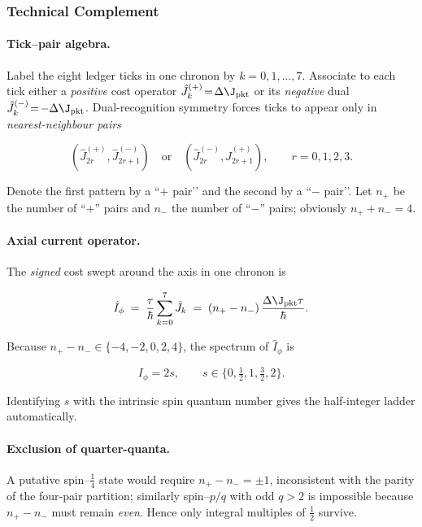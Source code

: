 \documentclass[11pt,oneside]{book}
\begin{document}
\subsubsection*{Technical Complement}

\paragraph{Tick–pair algebra.}
Label the eight ledger ticks in one chronon 
by \(k\!=\!0,1,\dots ,7\).  
Associate to each tick either a \emph{positive} cost operator
\(\hat J^{(+)}_{k}\!=\!\Delta\J_{\text{pkt}}\)  
or its \emph{negative} dual
\(\hat J^{(-)}_{k}\!=\!-\Delta\J_{\text{pkt}}\).  
Dual-recognition symmetry forces ticks to appear only in
\emph{nearest-neighbour pairs}

\[
  (\hat J^{(+)}_{2r},\hat J^{(-)}_{2r+1})
  \quad\text{or}\quad
  (\hat J^{(-)}_{2r},\hat J^{(+)}_{2r+1}),
  \qquad r=0,1,2,3.
\]

Denote the first pattern by a “$+$ pair’’ and the second by a
“$-$ pair’’.  
Let \(n_{+}\) be the number of “$+$” pairs and \(n_{-}\) the number of
“$-$” pairs; obviously \(n_{+}+n_{-}=4\).

\paragraph{Axial current operator.}
The \emph{signed} cost swept around the axis in one chronon is

\[
  \hat I_{\phi}
  \;=\;
  \frac{\tau}{\hbar}\sum_{k=0}^{7}\hat J_{k}
  \;=\;
  (n_{+}-n_{-})\,\frac{\Delta\J_{\text{pkt}}\tau}{\hbar}.
\]

Because \(n_{+}-n_{-}\in\{-4,-2,0,2,4\}\), the spectrum of
\(\hat I_{\phi}\) is

\[
  I_{\phi} = 2s,\qquad
  s \in \{0,\tfrac12,1,\tfrac32,2\}.
\]

Identifying \(s\) with the intrinsic spin quantum number gives the
half-integer ladder automatically.

\paragraph{Exclusion of quarter-quanta.}
A putative spin–\(\tfrac14\) state would require  
\(n_{+}-n_{-}=\pm1\),  
inconsistent with the parity of the
four-pair partition;  
similarly spin–\(p/q\) with odd \(q>2\) is impossible because
\(n_{+}-n_{-}\) must remain \emph{even}.  
Hence only integral multiples of \(\tfrac12\) survive.
\end{document}
